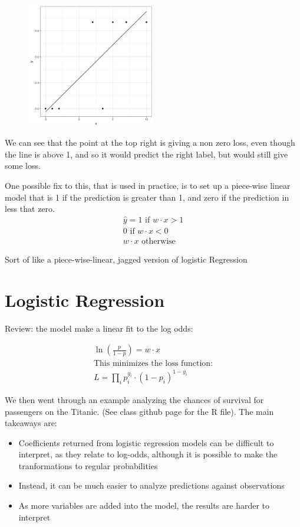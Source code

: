 \begin{figure}[ht]
  \begin{center}
    \includegraphics[width=0.5\textwidth]{figures/CAR.png}
    \label{fig:Solving Classification using Linear Reggredssion}
  \end{center}
\end{figure}



We can see that the point at the top right is giving a non zero loss, even though the line is above 1, and so it would predict the right label, but would still give some loss. 

One possible fix to this, that is used in practice, is to set up a piece-wise linear model that is 1 if the prediction is greater than 1, and zero if the prediction in less that zero. 
\begin{eqnarray*}
  \hat{y} = 1 \textrm{ if } w\cdot x > 1 \\
      0 \textrm{ if } w\cdot x < 0 \\
      w\cdot x \textrm{ otherwise}
\end{eqnarray*}

Sort of like a piece-wise-linear, jagged version of logistic Regression

\section{Logistic Regression}
Review: the model make a linear fit to the log odds:

\begin{eqnarray*}
  \ln (\frac{p}{1-p}) = w\cdot x \\
  \textrm{This minimizes the loss function:}\\
  L = \prod_i p_i^{y_i}\cdot(1-p_i)^{1-y_i}
\end{eqnarray*}

We then went through an example analyzing the chances of survival for passengers on the Titanic. (See class github page for the R file). The main takeaways are:
\begin{itemize}
  \item Coefficients returned from logistic regression models can be difficult to interpret, as they relate to log-odds, although it is possible to make the tranformations to regular probabilities
  \item Instead, it can be much easier to analyze predictions against observations
  \item As more variables are added into the model, the results are harder to interpret
\end{itemize}

